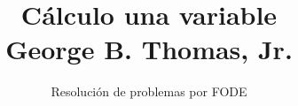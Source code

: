 \normalfont

\author{\Large Resolución de problemas por FODE}
\title{Cálculo una variable \\ \small George B. Thomas, Jr.}
\date{}
\pagestyle{empty}
\maketitle
\thispagestyle{empty}
\let\cleardoublepage\clearpage
\tableofcontents								%


 
\let\cleardoublepage\clearpage
